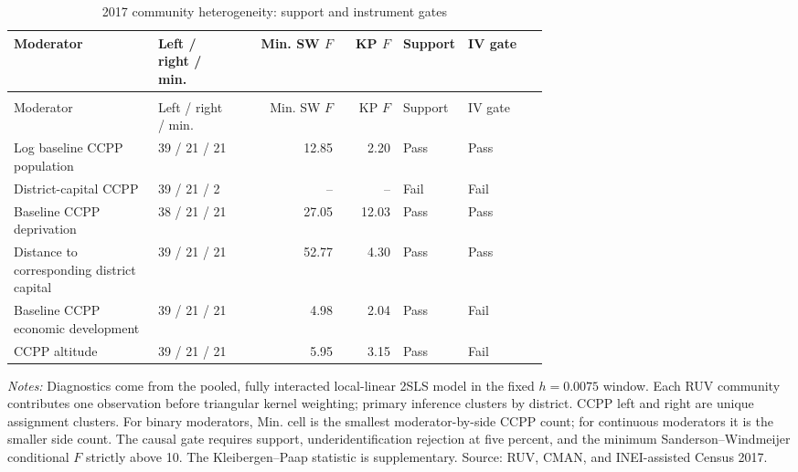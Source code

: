 \begingroup\fontsize{9.25}{11.4}\selectfont
\setlength{\tabcolsep}{3pt}\renewcommand{\arraystretch}{1.18}
\begin{longtable}{@{}>{\raggedright\arraybackslash}p{0.27\linewidth}p{0.16\linewidth}rrp{0.10\linewidth}p{0.15\linewidth}@{}}
\caption{2017 community heterogeneity: support and instrument gates}\label{tab:pub_A07} \\
\toprule Moderator & Left / right / min. & Min. SW \(F\) & KP \(F\) & Support & IV gate \\ \midrule\endfirsthead
\multicolumn{6}{c}{\tablename\ \thetable{} -- continued} \\
\toprule Moderator & Left / right / min. & Min. SW \(F\) & KP \(F\) & Support & IV gate \\ \midrule\endhead
Log baseline CCPP population & 39 / 21 / 21 & 12.85 & 2.20 & Pass & Pass \\
District-capital CCPP & 39 / 21 / 2 & -- & -- & Fail & Fail \\
Baseline CCPP deprivation & 38 / 21 / 21 & 27.05 & 12.03 & Pass & Pass \\
Distance to corresponding district capital & 39 / 21 / 21 & 52.77 & 4.30 & Pass & Pass \\
Baseline CCPP economic development & 39 / 21 / 21 & 4.98 & 2.04 & Pass & Fail \\
CCPP altitude & 39 / 21 / 21 & 5.95 & 3.15 & Pass & Fail \\
\bottomrule\end{longtable}
\parbox{0.97\linewidth}{\footnotesize \textit{Notes:} Diagnostics come from the pooled, fully interacted local-linear 2SLS model in the fixed \(h=0.0075\) window. Each RUV community contributes one observation before triangular kernel weighting; primary inference clusters by district. CCPP left and right are unique assignment clusters. For binary moderators, Min. cell is the smallest moderator-by-side CCPP count; for continuous moderators it is the smaller side count. The causal gate requires support, underidentification rejection at five percent, and the minimum Sanderson--Windmeijer conditional \(F\) strictly above 10. The Kleibergen--Paap statistic is supplementary. Source: RUV, CMAN, and INEI-assisted Census 2017.}
\par{}\par\endgroup

